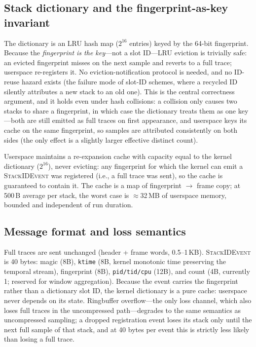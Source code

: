 \documentclass[letterpaper,twocolumn,10pt]{article}
\begin{document}
\subsection{Stack dictionary and the fingerprint-as-key invariant}
The dictionary is an LRU hash map ($2^{16}$ entries) keyed by the 64-bit
fingerprint. Because the \emph{fingerprint is the key}---not a slot
ID---LRU eviction is trivially safe: an evicted fingerprint misses on the
next sample and reverts to a full trace; userspace re-registers it. No
eviction-notification protocol is needed, and no ID-reuse hazard exists
(the failure mode of slot-ID schemes, where a recycled ID silently
attributes a new stack to an old one). This is the central correctness
argument, and it holds even under hash collisions: a collision only causes
two stacks to share a fingerprint, in which case the dictionary treats
them as one key---both are still emitted as full traces on first
appearance, and userspace keys its cache on the same fingerprint, so
samples are attributed consistently on both sides (the only effect is a
slightly larger effective distinct count).

Userspace maintains a re-expansion cache with capacity equal to the kernel
dictionary ($2^{16}$), never evicting: any fingerprint for which the kernel
can emit a \textsc{StackIDEvent} was registered (i.e., a full trace was
sent), so the cache is guaranteed to contain it. The cache is a map of
fingerprint $\rightarrow$ frame copy; at 500\,B average per stack, the
worst case is $\approx$32\,MB of userspace memory, bounded and independent
of run duration.

\subsection{Message format and loss semantics}
Full traces are sent unchanged (header + frame words, 0.5--1\,KB).
\textsc{StackIDEvent} is 40 bytes: magic (8B), \texttt{ktime} (8B, kernel
monotonic time preserving the temporal stream), fingerprint (8B),
\texttt{pid/tid/cpu} (12B), and count (4B, currently 1; reserved for
window aggregation). Because the event carries the fingerprint rather than
a dictionary slot ID, the kernel dictionary is a pure cache: userspace
never depends on its state. Ringbuffer overflow---the only loss channel,
which also loses full traces in the uncompressed path---degrades to the
same semantics as uncompressed sampling; a dropped registration event
loses its stack only until the next full sample of that stack, and at 40
bytes per event this is strictly less likely than losing a full trace.
\end{document}
